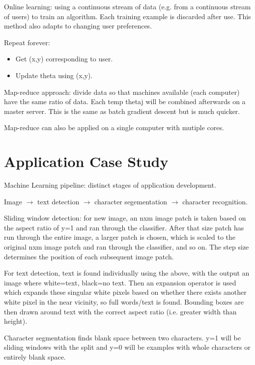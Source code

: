 \documentclass[12pt, a4paper]{article}
\begin{document}
{  Online learning: using a continuous stream of data (e.g. from a continuous 
  stream of users) to train an algorithm. Each training example is discarded
  after use. This method also adapts to changing user preferences. 

  Repeat forever:
  \vspace{-1em}
  \begin{itemize}
  \item Get (x,y) corresponding to user.
  \item Update theta using (x,y).
  \end{itemize}

  Map-reduce approach: divide data so that machines available (each computer)
  have the same ratio of data. Each temp thetaj will be combined afterwards on
  a master server. This is the same as batch gradient descent but is much 
  quicker.
  
  Map-reduce can also be applied on a single computer with mutiple cores.
  
  \newpage
  
\section{Application Case Study}

  Machine Learning pipeline: distinct stages of application development.
  
  Image $\to$ text detection $\to$ character segementation $\to$ character 
  recognition.

  Sliding window detection: for new image, an nxm image patch is taken based on
  the aspect ratio of y=1 and ran through the classifier. After that size patch 
  has run through the entire image, a larger patch is chosen, which is scaled 
  to the original nxm image patch and ran through the classifier, and so on. 
  The step size determines the position of each subsequent image patch. 

  For text detection, text is found individually using the above, with the 
  output an image where white=text, black=no text. Then an expansion 
  operator is used which expands these singular white pixels based on whether
  there exists another white pixel in the near vicinity, so full words/text
  is found. Bounding boxes are then drawn around text with the correct aspect
  ratio (i.e. greater width than height). 

  Character segmentation finds blank space between two characters. y=1 will be
  sliding windows with the split and y=0 will be examples with whole characters
  or entirely blank space. 

}
\end{document}
